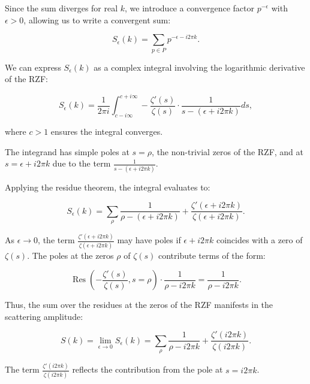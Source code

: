 \documentclass[11pt, oneside]{article}
\begin{document}
Since the sum diverges for real $k$, we introduce a convergence factor $p^{-\epsilon}$ with $\epsilon > 0$, allowing us to write a convergent sum:

\begin{equation}
S_\epsilon(k) = \sum_{p \in P} p^{- \epsilon - i 2\pi k}.
\end{equation}

We can express $S_\epsilon(k)$ as a complex integral involving the logarithmic derivative of the RZF:

\begin{equation}
S_\epsilon(k) = \frac{1}{2\pi i} \int_{c - i \infty}^{c + i \infty} -\frac{\zeta'(s)}{\zeta(s)} \cdot \frac{1}{s - (\epsilon + i 2\pi k)} ds,
\end{equation}

where $c > 1$ ensures the integral converges.

The integrand has simple poles at $s = \rho$, the non-trivial zeros of the RZF, and at $s = \epsilon + i 2\pi k$ due to the term $\frac{1}{s - (\epsilon + i 2\pi k)}$.

Applying the residue theorem, the integral evaluates to:

\begin{equation}
S_\epsilon(k) = \sum_{\rho} \frac{1}{\rho - (\epsilon + i 2\pi k)} + \frac{\zeta'(\epsilon + i 2\pi k)}{\zeta(\epsilon + i 2\pi k)}.
\end{equation}

As $\epsilon \to 0$, the term $\frac{\zeta'(\epsilon + i 2\pi k)}{\zeta(\epsilon + i 2\pi k)}$ may have poles if $\epsilon + i 2\pi k$ coincides with a zero of $\zeta(s)$. The poles at the zeros $\rho$ of $\zeta(s)$ contribute terms of the form:

\begin{equation}
\operatorname{Res}\left(-\frac{\zeta'(s)}{\zeta(s)}, s = \rho\right) \cdot \frac{1}{\rho - i 2\pi k} = \frac{1}{\rho - i 2\pi k}.
\end{equation}

Thus, the sum over the residues at the zeros of the RZF manifests in the scattering amplitude:

\begin{equation}
S(k) = \lim_{\epsilon \to 0} S_\epsilon(k) = \sum_{\rho} \frac{1}{\rho - i 2\pi k} + \frac{\zeta'(i 2\pi k)}{\zeta(i 2\pi k)}.
\end{equation}

The term $\frac{\zeta'(i 2\pi k)}{\zeta(i 2\pi k)}$ reflects the contribution from the pole at $s = i 2\pi k$.
\end{document}
